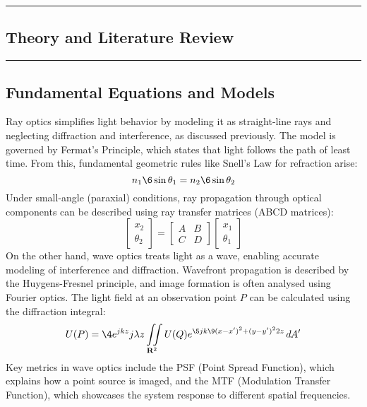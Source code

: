 {\color{gray}\hrule}
\begin{center}
\section{Theory and Literature Review}
\bigskip
\end{center}
{\color{gray}\hrule}
\begin{multicols}{2}
\subsection{Fundamental Equations and Models}
Ray optics simplifies light behavior by modeling it as straight-line rays and neglecting diffraction and interference,
as discussed previously. The model is governed by Fermat's Principle, which states that light follows the path of least time.
From this, fundamental geometric rules like Snell's Law for refraction arise: 
\[
n_1\6\sin{\theta_1} = n_2\6\sin{\theta_2}
\]
Under small-angle (paraxial) conditions, ray propagation through optical components can be described using ray transfer matrices (ABCD matrices): \[
\begin{bmatrix}
x_2 \\ \theta_2
\end{bmatrix} = \begin{bmatrix} A & B \\ C & D \end{bmatrix} \begin{bmatrix} x_1 \\ \theta_1 \end{bmatrix} 
\]
On the other hand, wave optics treats light as a wave, enabling accurate modeling of interference and diffraction. Wavefront propagation 
is described by the Huygens-Fresnel principle, and image formation is often analysed using Fourier optics. 
The light field at an observation point $P$ can be calculated using the diffraction integral:
\[
U(P) = \4{e^{jkz}}{j\lambda z} \iint\limits_{\R^2} U(Q) e^{\5{jk\9{(x-x')^2 + (y-y')^2}}{2z}} \dd A'
\]
Key metrics in wave optics include the PSF (Point Spread Function), which explains how a point source is imaged, and the MTF (Modulation Transfer Function),
 which showcases the system response to different spatial frequencies.
\end{multicols}
